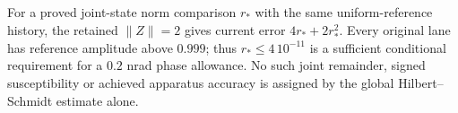 For a proved joint-state norm comparison $r_*$ with the same
uniform-reference history, the retained
$\|Z\|=2$ gives current error $4r_*+2r_*^2$.  Every original lane has
reference amplitude above $0.999$; thus $r_*\le4\,10^{-11}$ is a sufficient
conditional requirement for a $0.2$ nrad phase allowance.  No such joint
remainder, signed susceptibility or achieved apparatus accuracy is assigned
by the global Hilbert--Schmidt estimate alone.
